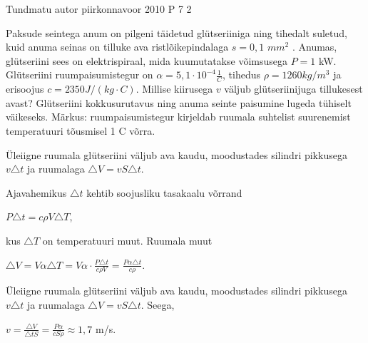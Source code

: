 {Tundmatu autor} %
{piirkonnavoor} %
{2010} %
{P 7} %
{2} %
{

\ifStatement
Paksude seintega anum on pilgeni täidetud glütseriiniga ning tihedalt suletud, kuid anuma seinas on tilluke ava ristlõikepindalaga $s = 0,1$ $mm^2$ . Anumas, glütseriini sees on elektrispiraal, mida kuumutatakse võimsusega $P = 1$ kW. Glütseriini ruumpaisumistegur on $\alpha = 5,1 \cdot 10^{-4} \frac{1}{C}$, tihedus $\rho = 1260 kg/m^3$ ja erisoojus $c = 2350 J/(kg \cdot C)$. Millise kiirusega $v$ väljub glütseriinijuga tillukesest avast? Glütseriini kokkusurutavus ning anuma seinte paisumine lugeda tühiselt väikeseks. Märkus: ruumpaisumistegur kirjeldab ruumala suhtelist suurenemist temperatuuri tõusmisel 1 C võrra.
\fi

\ifHint
Üleiigne ruumala glütseriini väljub ava kaudu, moodustades silindri pikkusega $v \triangle t$ ja ruumalaga $\triangle V = v S \triangle t$.
\fi

\ifSolution
Ajavahemikus $\triangle t$ kehtib soojusliku tasakaalu võrrand
\begin{center}
$P \triangle t = c \rho V \triangle T$,
\end{center}
kus $\triangle T$ on temperatuuri muut. Ruumala muut 
\begin{center}
$\triangle V = V \alpha \triangle T = V \alpha \cdot \frac{P \triangle t}{c \rho V} = \frac{P \alpha \triangle t}{c \rho}$.
\end{center}
Üleiigne ruumala glütseriini väljub ava kaudu, moodustades silindri pikkusega $v \triangle t$ ja ruumalaga $\triangle V = v S \triangle t$. Seega,
\begin{center}
$v = \frac{\triangle V}{\triangle t S} = \frac{P \alpha}{cS \rho} \approx 1,7$ m/s.
\end{center}
\fi
}